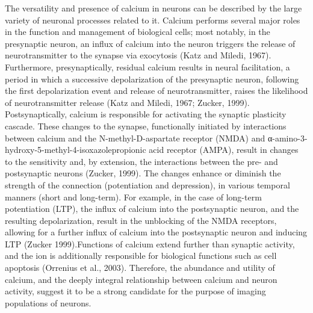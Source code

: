\documentclass{article}
\begin{document}
The versatility and presence of calcium in neurons can be described by the large variety of neuronal processes related to it. Calcium performs several major roles in the function and management of biological cells; most notably, in the presynaptic neuron, an influx of calcium into the neuron triggers the release of neurotransmitter to the synapse via exocytosis (Katz and Miledi, 1967). Furthermore, presynaptically, residual calcium results in neural facilitation, a period in which a successive depolarization of the presynaptic neuron, following the first depolarization event and release of neurotransmitter, raises the likelihood of neurotransmitter release (Katz and Miledi, 1967; Zucker, 1999). Postsynaptically, calcium is responsible for activating the synaptic plasticity cascade. These changes to the synapse, functionally initiated by interactions between calcium and the N-methyl-D-aspartate receptor (NMDA) and α-amino-3-hydroxy-5-methyl-4-isoxazolepropionic acid receptor (AMPA), result in changes to the sensitivity and, by extension, the interactions between the pre- and postsynaptic neurons (Zucker, 1999). The changes enhance or diminish the strength of the connection (potentiation and depression), in various temporal manners (short and long-term). For example, in the case of long-term potentiation (LTP), the influx of calcium into the postsynaptic neuron, and the resulting depolarization, result in the unblocking of the NMDA receptors, allowing for a further influx of calcium into the postsynaptic neuron and inducing LTP (Zucker 1999).Functions of calcium extend further than synaptic activity, and the ion is additionally responsible for biological functions such as cell apoptosis (Orrenius et al., 2003). Therefore, the abundance and utility of calcium, and the deeply integral relationship between calcium and neuron activity, suggest it to be a strong candidate for the purpose of imaging populations of neurons.\par
\end{document}
